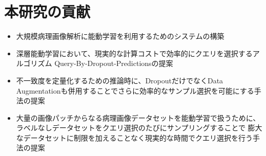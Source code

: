 \section{本研究の貢献}
\begin{itemize}
    \item 大規模病理画像解析に能動学習を利用するためのシステムの構築
    \item 深層能動学習において、現実的な計算コストで効率的にクエリを選択するアルゴリズム Query-By-Dropout-Predictionsの提案
    \item 不一致度を定量化するための推論時に、DropoutだけでなくData Augmentationも併用することでさらに効率的なサンプル選択を可能にする手法の提案
    \item 大量の画像パッチからなる病理画像データセットを能動学習で扱うために、ラベルなしデータセットをクエリ選択のたびにサンプリングすることで
    膨大なデータセットに制限を加えることなく現実的な時間でクエリ選択を行う手法の提案
\end{itemize}
